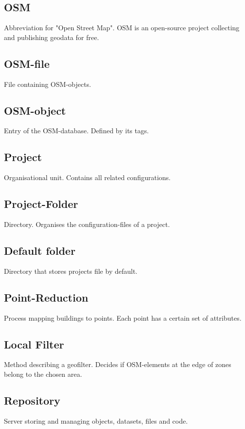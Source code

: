 \documentclass[parskip=full]{scrartcl} %
\begin{document}
\subsection*{OSM}
Abbreviation for "Open Street Map". OSM is an open-source project collecting and publishing geodata for free.

\subsection*{OSM-file}
File containing OSM-objects.

\subsection*{OSM-object}
Entry of the OSM-database. Defined by its tags.

\subsection*{Project}
Organisational unit. Contains all related configurations.

\subsection*{Project-Folder}
Directory. Organises the configuration-files of a project.

\subsection*{Default folder}
Directory that stores projects file by default.

\subsection*{Point-Reduction}
Process mapping buildings to points. Each point has a certain set of attributes.

\subsection*{Local Filter}
Method describing a geofilter. Decides if OSM-elements at the edge of zones belong to the chosen area. 

\subsection*{Repository}
Server storing and managing objects, datasets, files and code.
\end{document}
